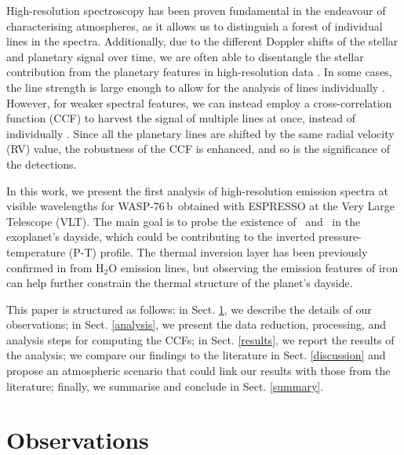 \documentclass{aa}
\newcommand{\feI}{\ion{Fe}{i}}
\newcommand{\feII}{\ion{Fe}{ii}}
\newcommand{\planet}{WASP-76\,b}
\begin{document}
High-resolution spectroscopy has been proven fundamental in the endeavour of characterising atmospheres, as it allows us to distinguish a forest of individual lines in the spectra. Additionally, due to the different Doppler shifts of the stellar and planetary signal over time, we are often able to disentangle the stellar contribution from the planetary features in high-resolution data \citep{snellen2010}. In some cases, the line strength is large enough to allow for the analysis of lines individually \citep{wyttenbach2015, allart2018, seidel2019, allart2023}. However, for weaker spectral features, we can instead employ a cross-correlation function (CCF) to harvest the signal of multiple lines at once, instead of individually \citep[e.g.][]{snellen2010, brogi2012, birkby2013, hoeijmakers2015, allart2017, ehrenreich2020, azevedosilva2022, prinoth2023}. Since all the planetary lines are shifted by the same radial velocity (RV) value, the robustness of the CCF is enhanced, and so is the significance of the detections.

In this work, we present the first analysis of high-resolution emission spectra at visible wavelengths for \planet\ obtained with ESPRESSO at the Very Large Telescope (VLT). The main goal is to probe the existence of \feI\ and \feII\ in the exoplanet's dayside, which could be contributing to the inverted pressure-temperature (P-T) profile. The thermal inversion layer has been previously confirmed in \citet{yan2023} from H$_2$O emission lines, but observing the emission features of iron can help further constrain the thermal structure of the planet's dayside.

This paper is structured as follows: in Sect. \ref{obs}, we describe the details of our observations; in Sect. \ref{analysis}, we present the data reduction, processing, and analysis steps for computing the CCFs; in Sect. \ref{results}, we report the results of the analysis; we compare our findings to the literature in Sect. \ref{discussion} and propose an atmospheric scenario that could link our results with those from the literature; finally, we summarise and conclude in Sect. \ref{summary}.


\section{Observations} \label{obs}
\end{document}
